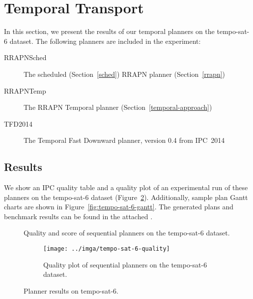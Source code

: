 \section{Temporal Transport}

In this section, we present the results of our temporal planners on the tempo-sat-6 dataset. The following planners are included in the experiment:
\begin{description}
\item[RRAPNSched] The scheduled (Section~\ref{sched}) RRAPN planner (Section~\ref{rrapn})
\item[RRAPNTemp] The RRAPN Temporal planner (Section~\ref{temporal-approach})
\item[TFD2014] The Temporal Fast Downward planner, version 0.4 from IPC~2014 \citep[Preferring Preferred Operators in Temporal Fast Downward]{Vallati2015}
\end{description}

\subsection{Results}\label{temporal-results}

We show an IPC quality table and a quality plot of an experimental run of these planners on the tempo-sat-6 dataset (Figure~\ref{fig:tempo-sat-6-results}).
Additionally, sample plan Gantt charts are shown in Figure~\ref{fig:tempo-sat-6-gantt}. The generated plans and benchmark results can be found in the attached .

\begin{figure}[tbp]
\centering
\begin{subtable}{\textwidth}
\centering
\scriptsize
\renewcommand{\footnotesize}{\scriptsize}

\caption{Quality and score of sequential planners on the tempo-sat-6 dataset.}
\label{tab:tempo-sat-6-ipc-scores}
\end{subtable}

\vspace{0.5cm}
\begin{subfigure}{\textwidth}
\centering
\texttt{[image: ../imga/tempo-sat-6-quality]}
\caption{Quality plot of sequential planners on the tempo-sat-6 dataset.}
\label{fig:tempo-sat-6-quality}
\end{subfigure}
\caption{Planner results on tempo-sat-6.}
\label{fig:tempo-sat-6-results}
\end{figure}

